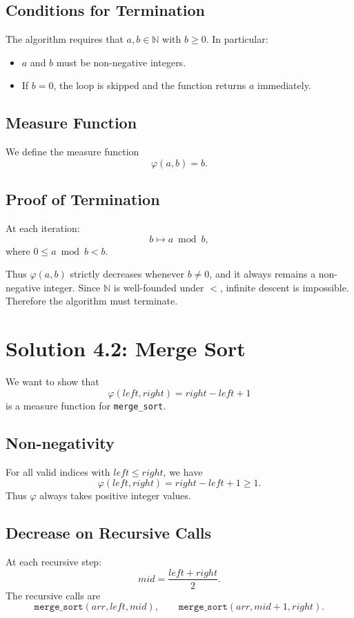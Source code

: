 \documentclass{article}
\theoremstyle{plain}
\theoremstyle{definition}
\theoremstyle{remark}
\begin{document}
\subsection{Conditions for Termination}
The algorithm requires that $a, b \in \mathbb{N}$ with $b \geq 0$. In particular:
\begin{itemize}
    \item $a$ and $b$ must be non-negative integers.
    \item If $b = 0$, the loop is skipped and the function returns $a$ immediately.
\end{itemize}

\subsection{Measure Function}
We define the measure function
\[
    \varphi(a,b) = b.
\]

\subsection{Proof of Termination}
At each iteration:
\[
    b \longmapsto a \bmod b,
\]
where $0 \leq a \bmod b < b$.

Thus $\varphi(a,b)$ strictly decreases whenever $b \neq 0$, and it always remains a non-negative integer. Since $\mathbb{N}$ is well-founded under $<$, infinite descent is impossible. Therefore the algorithm must terminate.

\section{Solution 4.2: Merge Sort}

We want to show that
\[
    \varphi(left, right) = right - left + 1
\]
is a measure function for \texttt{merge\_sort}.

\subsection{Non-negativity}
For all valid indices with $left \leq right$, we have
\[
    \varphi(left, right) = right - left + 1 \geq 1.
\]
Thus $\varphi$ always takes positive integer values.

\subsection{Decrease on Recursive Calls}
At each recursive step:
\[
    mid = \frac{left + right}{2}.
\]
The recursive calls are
\[
    \texttt{merge\_sort}(arr, left, mid), \qquad \texttt{merge\_sort}(arr, mid+1, right).
\]
\end{document}
